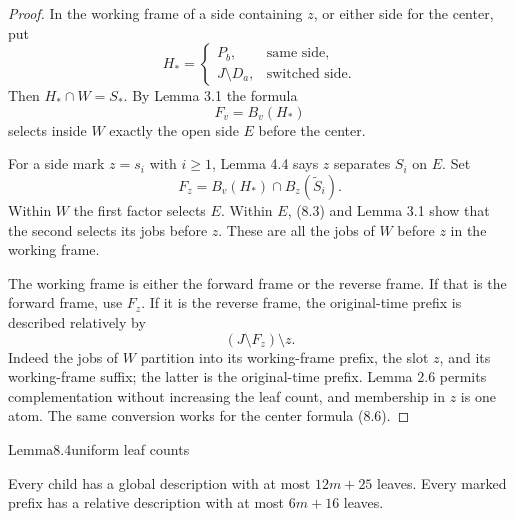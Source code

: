 \begin{proof}
In the working frame of a side containing \(z\), or either side for the center, put \[
H_*=
\begin{cases}
P_b,&\text{same side},\\
J\setminus D_a,&\text{switched side}.
\end{cases}
\] Then \(H_*\cap W=S_*\). By Lemma 3.1 the formula \[
F_v=B_v(H_*)
\tag{8.6}
\] selects inside \(W\) exactly the open side \(E\) before the center.

For a side mark \(z=s_i\) with \(i\geq1\), Lemma 4.4 says \(z\) separates \(S_i\) on \(E\). Set \[
F_z=B_v(H_*)\cap B_z(\widetilde S_i).
\tag{8.7}
\] Within \(W\) the first factor selects \(E\). Within \(E\), (8.3) and Lemma 3.1 show that the second selects its jobs before \(z\). These are all the jobs of \(W\) before \(z\) in the working frame.

The working frame is either the forward frame or the reverse frame. If that is the forward frame, use \(F_z\). If it is the reverse frame, the original-time prefix is described relatively by \[
(J\setminus F_z)\setminus z.
\tag{8.8}
\] Indeed the jobs of \(W\) partition into its working-frame prefix, the slot \(z\), and its working-frame suffix; the latter is the original-time prefix. Lemma 2.6 permits complementation without increasing the leaf count, and membership in \(z\) is one atom. The same conversion works for the center formula (8.6).
\end{proof}

\begin{numbered}{Lemma}{8.4}{uniform leaf counts}

Every child has a global description with at most \(12m+25\) leaves. Every marked prefix has a relative description with at most \(6m+16\) leaves.

\end{numbered}

